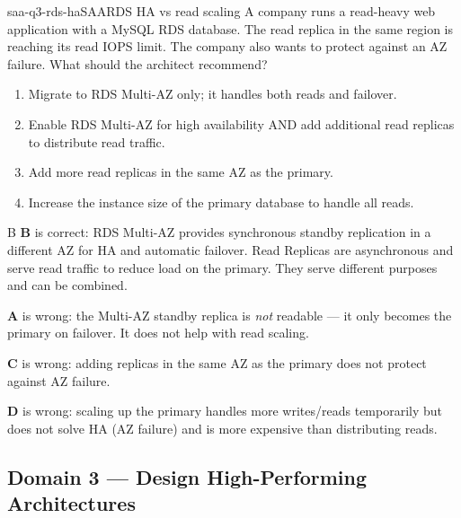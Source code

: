 \begin{question}{saa-q3-rds-ha}{SAA}{RDS HA vs read scaling}
A company runs a read-heavy web application with a MySQL RDS database. The read replica in the same region is reaching its read IOPS limit. The company also wants to protect against an AZ failure. What should the architect recommend?

\begin{enumerate}[label=\Alph*.]
  \item Migrate to RDS Multi-AZ only; it handles both reads and failover.
  \item Enable RDS Multi-AZ for high availability AND add additional read replicas to distribute read traffic.
  \item Add more read replicas in the same AZ as the primary.
  \item Increase the instance size of the primary database to handle all reads.
\end{enumerate}
\end{question}

\begin{answer}{B}
\textbf{B} is correct: RDS Multi-AZ provides synchronous standby replication in a different AZ for HA and automatic failover. Read Replicas are asynchronous and serve read traffic to reduce load on the primary. They serve different purposes and can be combined.

\textbf{A} is wrong: the Multi-AZ standby replica is \emph{not} readable --- it only becomes the primary on failover. It does not help with read scaling.

\textbf{C} is wrong: adding replicas in the same AZ as the primary does not protect against AZ failure.

\textbf{D} is wrong: scaling up the primary handles more writes/reads temporarily but does not solve HA (AZ failure) and is more expensive than distributing reads.
\end{answer}


\subsection{Domain 3 --- Design High-Performing Architectures}

